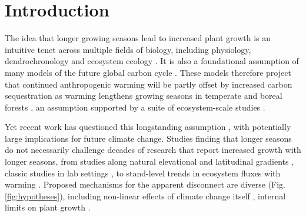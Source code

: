 \documentclass[11pt]{article}
\begin{document}
\section*{Introduction} %

The idea that longer growing seasons lead to increased plant growth is an intuitive tenet across multiple fields of biology, including physiology, dendrochronology and ecosystem ecology \citep{nobel1983biophysical,frank2022dendrochronology}. It is also a foundational assumption of many models of the future global carbon cycle \citep[e.g.][]{friedlingstein2022global, ito2020global}. These models therefore project that continued anthropogenic warming will be partly offset by increased carbon sequestration as warming lengthens growing seasons in temperate and boreal forests \citep{friedlingstein2022global}, an assumption supported by a suite of ecosystem-scale studies \citep{chen1999effects,keenan2014net,finzi2020}. 

Yet recent work has questioned this longstanding assumption \citep[e.g.][]{dow2022warm,green2022limits,silvestro2023longer}, with potentially large implications for future climate change. %
Studies finding that longer seasons do not necessarily challenge decades of research that report increased growth with longer seasons, from studies along natural elevational and latitudinal gradients \citep[][]{myneni1997increased,berdanier2011growing,king2013tree,cuapio2022there}, classic studies in lab settings \citep{went1957experimental}, to stand-level trends in ecosystem fluxes with warming \citep{chen1999effects,keenan2014net,finzi2020}. Proposed mechanisms for the apparent disconnect are diverse (Fig. \ref{fig:hypotheses}), including non-linear effects of climate change itself \citep[e.g., drought or heat stress,][]{dow2022warm}, internal limits on plant growth  \citep{zohner2023effect}. %
\end{document}
